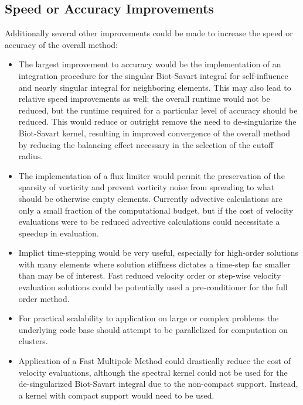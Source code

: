 \documentclass[letterpaper,12pt]{report}
\begin{document}
\subsection{Speed or Accuracy Improvements}
Additionally several other improvements could be made to increase the speed or accuracy of the overall method:
\begin{itemize}
\item The largest improvement to accuracy would be the implementation of an integration procedure for the singular Biot-Savart integral for self-influence and nearly singular integral for neighboring elements. This may also lead to relative speed improvements as well; the overall runtime would not be reduced, but the runtime required for a particular level of accuracy should be reduced. This would reduce or outright remove the need to de-singularize the Biot-Savart kernel, resulting in improved convergence of the overall method by reducing the balancing effect necessary in the selection of the cutoff radius.
\item The implementation of a flux limiter would permit the preservation of the sparsity of vorticity and prevent vorticity noise from spreading to what should be otherwise empty elements. Currently advective calculations are only a small fraction of the computational budget, but if the cost of velocity evaluations were to be reduced advective calculations could necessitate a speedup in evaluation.
\item Implict time-stepping would be very useful, especially for high-order solutions with many elements where solution stiffness dictates a time-step far smaller than may be of interest. Fast reduced velocity order or step-wise velocity evaluation solutions could be potentially used a pre-conditioner for the full order method.
\item For practical scalability to application on large or complex problems the underlying code base should attempt to be parallelized for computation on clusters.
\item Application of a Fast Multipole Method \cite{GreengardRokhlin1987} could drastically reduce the cost of velocity evaluations, although the spectral kernel could not be used for the de-singularized Biot-Savart integral due to the non-compact support. Instead, a kernel with compact support would need to be used.
\end{itemize}
\end{document}
